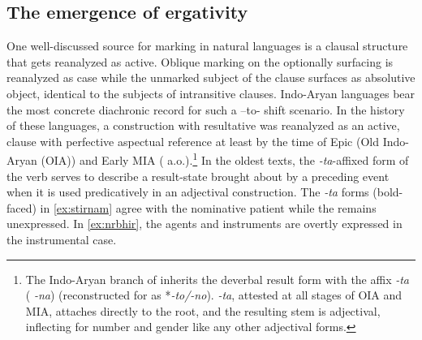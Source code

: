 \documentclass[output=paper,
modfonts
]{LSP/langsci}
\begin{document}
\subsection{The emergence of ergativity} 
One well-discussed source for  marking in natural languages is a  clausal structure that gets reanalyzed as active. Oblique marking on the optionally surfacing   is reanalyzed as  case while the unmarked subject of the  clause surfaces as absolutive object, identical to the subjects of intransitive clauses.  Indo-Aryan languages  bear the most concrete diachronic record for such a --to- shift scenario. In the history of these languages, a  construction with resultative  was reanalyzed as an active, 
clause with perfective aspectual reference at least by the time of Epic  (Old Indo-Aryan (OIA)) and Early MIA (\citealt{andersen86,peterson98,condoravdideo14} a.o.).\footnote{The Indo-Aryan branch of  inherits the deverbal
result   form with the affix \textit{-ta}
( \textit{-na}) (reconstructed for  as *\textit{-to/-no}). \textit{-ta}, attested at all stages of  OIA and MIA, attaches directly to the root, and the resulting stem is adjectival,  inflecting for number and gender like any other adjectival forms.} In the oldest  texts, the \textit{-ta}-affixed form of the verb serves to describe a result-state
brought about by a preceding event when it is used predicatively in
an adjectival  construction. The \textit{-ta} forms (bold-faced) in \cref{ex:stirnam} agree
with the nominative patient while the  remains unexpressed. In
\cref{ex:nrbhir}, the agents and instruments are overtly expressed in the instrumental
case.
\end{document}
